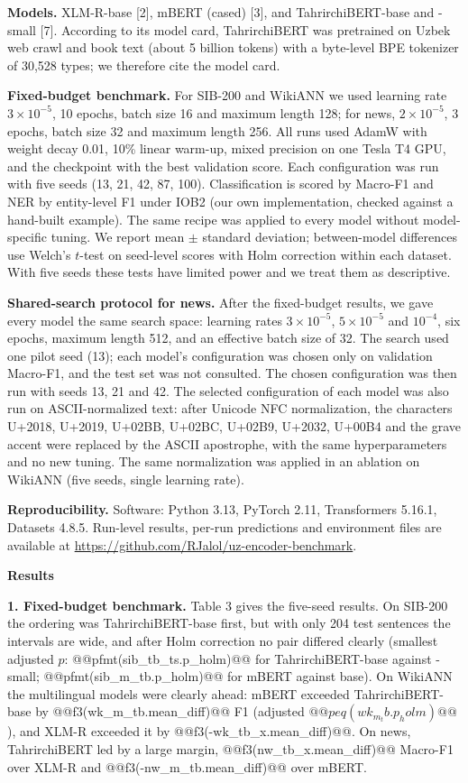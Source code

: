 \documentclass[11pt]{book}
\begin{document}
\textbf{Models.} XLM-R-base [2], mBERT (cased) [3], and TahrirchiBERT-base and -small [7]. According to its model card, TahrirchiBERT was pretrained on Uzbek web crawl and book text (about 5 billion tokens) with a byte-level BPE tokenizer of 30,528 types; we therefore cite the model card.

\textbf{Fixed-budget benchmark.} For SIB-200 and WikiANN we used learning rate $3\times10^{-5}$, 10 epochs, batch size 16 and maximum length 128; for news, $2\times10^{-5}$, 3 epochs, batch size 32 and maximum length 256. All runs used AdamW with weight decay 0.01, 10\% linear warm-up, mixed precision on one Tesla T4 GPU, and the checkpoint with the best validation score. Each configuration was run with five seeds (13, 21, 42, 87, 100). Classification is scored by Macro-F1 and NER by entity-level F1 under IOB2 (our own implementation, checked against a hand-built example). The same recipe was applied to every model without model-specific tuning. We report mean $\pm$ standard deviation; between-model differences use Welch's $t$-test on seed-level scores with Holm correction within each dataset. With five seeds these tests have limited power and we treat them as descriptive.

\textbf{Shared-search protocol for news.} After the fixed-budget results, we gave every model the same search space: learning rates $3\times10^{-5}$, $5\times10^{-5}$ and $10^{-4}$, six epochs, maximum length 512, and an effective batch size of 32. The search used one pilot seed (13); each model's configuration was chosen only on validation Macro-F1, and the test set was not consulted. The chosen configuration was then run with seeds 13, 21 and 42. The selected configuration of each model was also run on ASCII-normalized text: after Unicode NFC normalization, the characters U+2018, U+2019, U+02BB, U+02BC, U+02B9, U+2032, U+00B4 and the grave accent were replaced by the ASCII apostrophe, with the same hyperparameters and no new tuning. The same normalization was applied in an ablation on WikiANN (five seeds, single learning rate).

\textbf{Reproducibility.} Software: Python 3.13, PyTorch 2.11, Transformers 5.16.1, Datasets 4.8.5. Run-level results, per-run predictions and environment files are available at \url{https://github.com/RJalol/uz-encoder-benchmark}.

\begin{center}
\textbf{Results}
\end{center}

\textbf{1. Fixed-budget benchmark.} Table 3 gives the five-seed results. On SIB-200 the ordering was TahrirchiBERT-base first, but with only 204 test sentences the intervals are wide, and after Holm correction no pair differed clearly (smallest adjusted $p$: @@pfmt(sib_tb_ts.p_holm)@@ for TahrirchiBERT-base against -small; @@pfmt(sib_m_tb.p_holm)@@ for mBERT against base). On WikiANN the multilingual models were clearly ahead: mBERT exceeded TahrirchiBERT-base by @@f3(wk_m_tb.mean_diff)@@ F1 (adjusted $@@peq(wk_m_tb.p_holm)@@$), and XLM-R exceeded it by @@f3(-wk_tb_x.mean_diff)@@. On news, TahrirchiBERT led by a large margin, @@f3(nw_tb_x.mean_diff)@@ Macro-F1 over XLM-R and @@f3(-nw_m_tb.mean_diff)@@ over mBERT.
\end{document}
